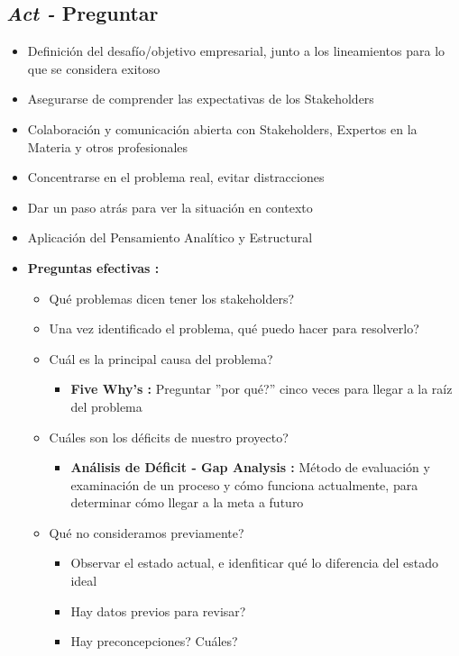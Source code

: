 \subsection{\textit{Act - }Preguntar}
\begin{itemize}
    \item {Definición del desafío/objetivo empresarial, junto a los lineamientos para lo que se considera exitoso}
    \item {Asegurarse de comprender las expectativas de los Stakeholders}
    \item {Colaboración y comunicación abierta con Stakeholders, Expertos en la Materia y otros profesionales}
    \item {Concentrarse en el problema real, evitar distracciones}
    \item {Dar un paso atrás para ver la situación en contexto}
    \item {Aplicación del Pensamiento Analítico y Estructural}
    \item {\textbf{Preguntas efectivas : }
    \begin{itemize}
        \item {Qué problemas dicen tener los stakeholders?}
        \item {Una vez identificado el problema, qué puedo hacer para resolverlo?}
        \item {Cuál es la principal causa del problema?
        \begin{itemize}
            \item {\textbf{Five Why's : }Preguntar ''por qué?'' cinco veces para llegar a la raíz del problema}
        \end{itemize}}
        \item {Cuáles son los déficits de nuestro proyecto?
        \begin{itemize}
            \item {\textbf{Análisis de Déficit - Gap Analysis : }Método de evaluación y examinación de un proceso y cómo funciona actualmente, para determinar cómo llegar a la meta a futuro}
        \end{itemize}}
        \item {Qué no consideramos previamente?
        \begin{itemize}
            \item {Observar el estado actual, e idenfiticar qué lo diferencia del estado ideal}
            \item {Hay datos previos para revisar?}
            \item {Hay preconcepciones? Cuáles?}

\end{itemize}}
\end{itemize}}
\end{itemize}
